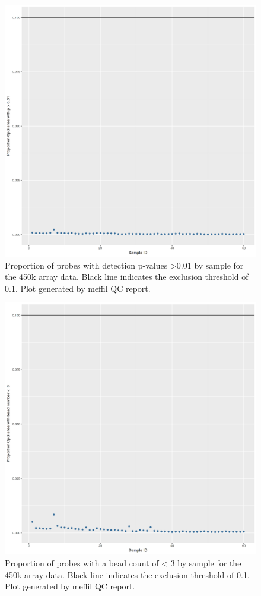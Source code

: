 \documentclass[
]{book}
\begin{document}
\begin{figure}

{\centering \includegraphics[width=0.8\linewidth]{figs/MAVIDOSqc450kpropSites} 

}

\caption{Proportion of probes with detection p-values \textgreater0.01 by sample for the 450k array data. Black line indicates the exclusion threshold of 0.1. Plot generated by meffil QC report.}\label{fig:MAVIDOSqc450kpropSites}
\end{figure}



\begin{figure}

{\centering \includegraphics[width=0.8\linewidth]{figs/MAVIDOSqc450kbeadNum} 

}

\caption{Proportion of probes with a bead count of \textless{} 3 by sample for the 450k array data.
Black line indicates the exclusion threshold of 0.1.
Plot generated by meffil QC report.}\label{fig:MAVIDOSqc450kbeadNum}
\end{figure}
\end{document}
